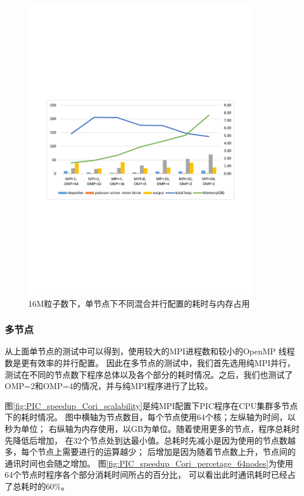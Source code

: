\begin{figure}[!htb]
  \centering
  \includegraphics[width=0.9\textwidth]{Img/PIC_speedup_Cori_1node_16m.pdf}
  \caption{16M粒子数下，单节点下不同混合并行配置的耗时与内存占用}
  \label{fig:PIC_speedup_Cori_1node_16m}
\end{figure}


\subsubsection{多节点}
从上面单节点的测试中可以得到，使用较大的MPI进程数和较小的OpenMP 线程数是更有效率的并行配置。
因此在多节点的测试中，我们首先选用纯MPI并行，测试在不同的节点数下程序总体以及各个部分的耗时情况。之后，我们也测试了OMP=2和OMP=4的情况，并与纯MPI程序进行了比较。

图\eqref{fig:PIC_speedup_Cori_scalability}是纯MPI配置下PIC程序在CPU集群多节点下的耗时情况。
图中横轴为节点数目，每个节点使用64个核；左纵轴为时间，以秒为单位；
右纵轴为内存使用，以GB为单位。随着使用更多的节点，程序总耗时先降低后增加，
在32个节点处到达最小值。总耗时先减小是因为使用的节点数越多，每个节点上需要进行的运算越少；
后增加是因为随着节点数上升，节点间的通讯时间也会随之增加。
图\eqref{fig:PIC_speedup_Cori_percetage_64nodes}为使用64个节点时程序各个部分消耗时间所占的百分比，
可以看出此时通讯耗时已经占了总耗时的60\%。

